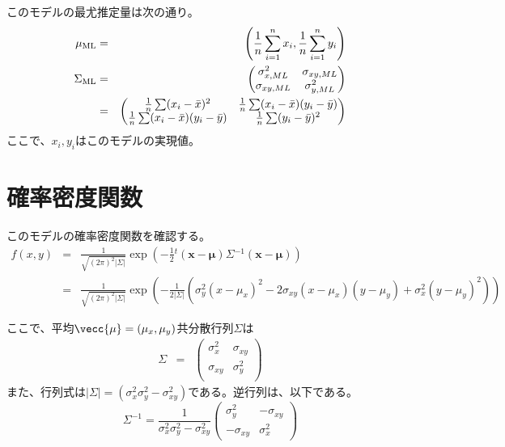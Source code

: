 このモデルの最尤推定量は次の通り。
\begin{eqnarray*}
 \mu_{\rm{ML}} &=& \left(\frac{1}{n}\sum_{i=1}^n x_i,\frac{1}{n}\sum_{i=1}^n y_i \right) \\
 \Sigma_{\rm{ML}} &=& \begin{pmatrix}
                       \sigma_{x,ML}^2& \sigma_{xy,ML}  \\
                       \sigma_{xy,ML} & \sigma_{y,ML}^2 \\
                      \end{pmatrix}\\
                      &=&
   \begin{pmatrix}
    \frac{1}{n}\sum (x_i-\bar{x})^2 &  \frac{1}{n}\sum (x_i-\bar{x})(y_i-\bar{y})\\
    \frac{1}{n}\sum (x_i-\bar{x})(y_i-\bar{y}) & \frac{1}{n}\sum (y_i-\bar{y})^2 \\
   \end{pmatrix}
\end{eqnarray*}
ここで、$x_i,y_i$はこのモデルの実現値。



\section{確率密度関数}
このモデルの確率密度関数を確認する。
\begin{eqnarray*}
 f(x,y)&=& \frac{1}{\sqrt{(2\pi)^2|\Sigma|}} \exp\left( -\frac{1}{2} {}^t\!(\bm{x-\mu})\Sigma\! ^{-1}(\bm{x-\mu}) \right) \\
 &= &\frac{1}{\sqrt{(2\pi)^2|\Sigma|}} \exp\left( -\frac{1}{2|\Sigma|}  \left(\sigma_y^2(x-\mu_x)^2 -2\sigma_{xy}(x-\mu_x)(y-\mu_y)+\sigma_x^2(y-\mu_y)^2\right) \right)
\end{eqnarray*}


ここで、平均$\vecc{\mu}=(\mu_x,\mu_y)$共分散行列$\Sigma$は
\begin{eqnarray*}
 \Sigma &=& \begin{pmatrix}
\sigma_x^2 &  \sigma_{xy}\\
           \sigma_{xy}& \sigma_y^2 \\
\end{pmatrix}
\end{eqnarray*}
また、行列式は$|\Sigma| = (\sigma_x^2\sigma_y^2-\sigma_{xy}^2)$である。逆行列は、以下である。
\begin{equation*}
 \Sigma^{-1} = \frac{1}{\sigma^2_x\sigma^2_y-\sigma^2_{xy}}\begin{pmatrix}
                \sigma^2_y & -\sigma_{xy}\\
                -\sigma_{xy} & \sigma^2_x
               \end{pmatrix}
\end{equation*}


